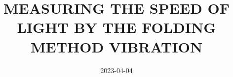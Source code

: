 \documentclass[a4paper]{article}
\title{MEASURING THE SPEED OF LIGHT BY THE FOLDING METHOD
VIBRATION}
\date{2023-04-04}
\begin{document}

\maketitle
\tableofcontents
\pagebreak





\end{document}
